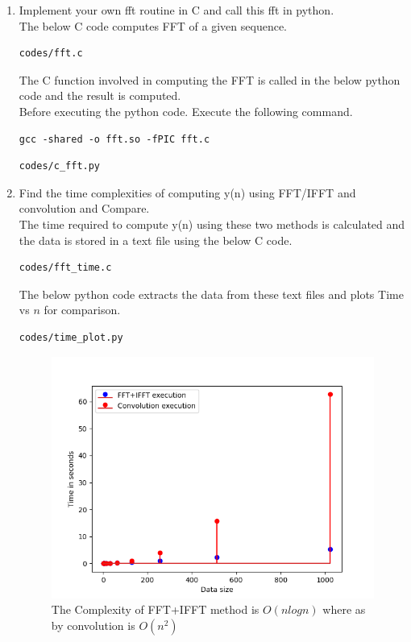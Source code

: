 \documentclass[journal,12pt,twocolumn]{IEEEtran}
\theoremstyle{remark}
\begin{document}
\begin{enumerate}[label=\thesection.\arabic*]
\item Implement your own fft routine in C and call this fft in python.\\

\solution The below C code computes FFT of a given sequence.
\begin{lstlisting}
codes/fft.c
\end{lstlisting}
The C function involved in computing the FFT is called in the below python code and the result is computed.\\

Before executing the  python code. Execute the following command.
\begin{lstlisting}
gcc -shared -o fft.so -fPIC fft.c
\end{lstlisting}

\begin{lstlisting}
codes/c_fft.py
\end{lstlisting}


\item Find the time complexities of computing y(n)
using FFT/IFFT and convolution and Compare.\\
\solution  The time required to compute y(n) using these two methods is calculated and the data is stored in a text file using the below C code.

\begin{lstlisting}
codes/fft_time.c
\end{lstlisting}
The below python code extracts the data from these text files and plots Time vs $n$ for comparison.
\begin{lstlisting}
codes/time_plot.py
\end{lstlisting}
\begin{figure}[h!]
\centering
\includegraphics[width=1\columnwidth]{figs/execplot.png}
\caption{The Complexity of FFT+IFFT method is $ O(nlogn)$ where as by convolution is $O(n^2)$}
\label{fig:time_complexity}
\end{figure}



\end{enumerate}
\end{document}
